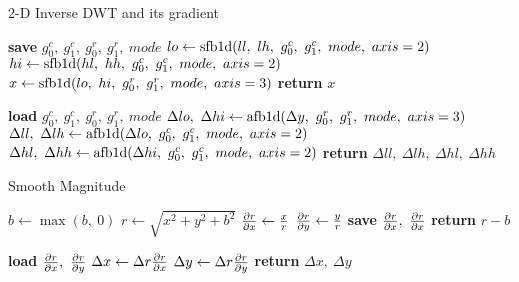 \begin{algorithm}[h!]
\caption{2-D Inverse DWT and its gradient}\label{alg:ch3:idwt}
\begin{algorithmic}[1]
  \State \textbf{save} $g_0^c,\ g_1^c,\ g_0^r,\ g_1^r,\ mode$  \label{line:ch3:idwt_save}
  \State $lo \gets \F{sfb1d}(ll,\ lh,\ g_0^c,\ g_1^c,\ mode,\ axis=2) $ 
  \State $hi \gets \F{sfb1d}(hl,\ hh,\ g_0^c,\ g_1^c,\ mode,\ axis=2) $
  \State $x \gets \mathrm{sfb1d}(lo,\ hi,\ g_0^r,\ g_1^r,\ mode,\ axis=3) $
  \State \textbf{return} $x$
\EndFunction
\end{algorithmic}\vspace{10pt}
\begin{algorithmic}[1]
  \State \textbf{load} $g_0^c,\ g_1^c,\ g_0^r,\ g_1^r,\ mode$
  \State $\Delta lo,\ \Delta hi \gets \mathrm{afb1d}(\Delta y,\ g_0^r,\ g_1^r,\ mode,\ axis=3)$ 
  \State $\Delta ll,\ \Delta lh \gets \F{afb1d}(\Delta lo,\ g_0^c,\ g_1^c,\ mode,\ axis=2)$ 
  \State $\Delta hl,\ \Delta hh \gets \F{afb1d}(\Delta hi,\ g_0^c,\ g_1^c,\ mode,\ axis=2)$ 
  \State \textbf{return} $\Delta ll,\ \Delta lh,\ \Delta hl,\ \Delta hh$
\EndFunction
\end{algorithmic}
\end{algorithm}

\begin{algorithm}[tb]
\caption{Smooth Magnitude}\label{alg:ch3:mag_smooth}
\begin{algorithmic}[1]
  \State $b \gets \max(b,\ 0)$
  \State $r \gets \sqrt{x^2 + y^2 + b^2}$
  \State $\frac{\partial r}{\partial x} \gets \frac{x}{r}$
  \State $\frac{\partial r}{\partial y} \gets \frac{y}{r}$
  \State \textbf{save} $\dydx{r}{x},\ \dydx{r}{x}$
  \State \textbf{return} $r - b$
\EndFunction
\end{algorithmic}\vspace{10pt}
\begin{algorithmic}[1]
  \State \textbf{load} $\dydx{r}{x},\ \dydx{r}{y}$
  \State $\Delta x \gets \Delta r \frac{\partial r}{\partial x}$
  \State $\Delta y \gets \Delta r \frac{\partial r}{\partial y}$
  \State \textbf{return} $\Delta x,\ \Delta y$
\EndFunction
\end{algorithmic}
\end{algorithm}

